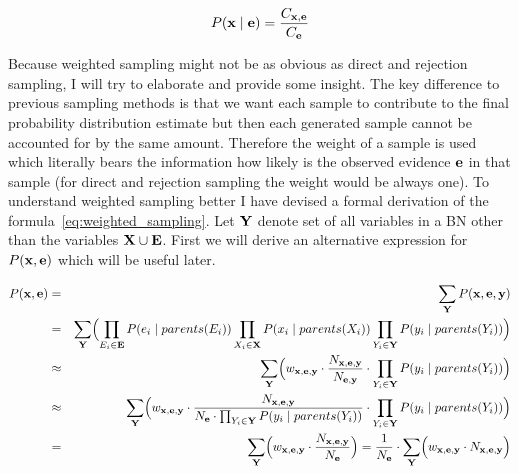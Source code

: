 \documentclass[english,cover]{fitthesis} %
\newcommand{\vars}[1]{{\bold{#1}}}         %
\begin{document}

\begin{equation}\label{eq:weighted_sampling}
    P(\vars{x} \mid \vars{e})
    = \frac{C_{\vars{x},\vars{e}}}{C_{\vars{e}}}
\end{equation}

Because weighted sampling might not be as obvious as direct and rejection sampling, I will try to elaborate and provide some insight. The key difference to previous sampling methods is that we want each sample to contribute to the final probability distribution estimate but then each generated sample cannot be accounted for by the same amount. Therefore the weight of a sample is used which literally bears the information how likely is the observed evidence $\vars{e}$ in that sample (for direct and rejection sampling the weight would be always one).
To understand weighted sampling better I have devised  a formal derivation of the formula~\eqref{eq:weighted_sampling}. Let $\vars{Y}$ denote set of all variables in a BN other than the variables $\vars{X} \cup \vars{E}$. First we will derive an alternative expression for $P(\vars{x}, \vars{e})$ which will be useful later.

\begin{eqnarray}
    P(\vars{x}, \vars{e})
    & = & \sum_\vars{Y} P(\vars{x}, \vars{e}, \vars{y}) \nonumber\\
    & = &
       \sum_\vars{Y} \Bigl( \prod_{E_i \in \vars{E}} P(e_i \mid parents(E_i)) \prod_{X_i \in \vars{X}} P(x_i \mid parents(X_i)) \prod_{Y_i \in \vars{Y}} P(y_i \mid parents(Y_i)) \Bigr) \nonumber\\
    & \approx &
       \sum_\vars{Y} \Bigl( w_{\vars{x},\vars{e},\vars{y}} \cdot \frac{N_{\vars{x},\vars{e},\vars{y}}}{N_{\vars{e},\vars{y}}} \cdot \prod_{Y_i \in \vars{Y}} P(y_i \mid parents(Y_i)) \Bigr) \nonumber\\
    & \approx &
       \sum_\vars{Y} \Bigl( w_{\vars{x},\vars{e},\vars{y}} \cdot \frac{N_{\vars{x},\vars{e},\vars{y}}}{N_{\vars{e}} \cdot \prod_{Y_i \in \vars{Y}} P(y_i \mid parents(Y_i))} \cdot \prod_{Y_i \in \vars{Y}} P(y_i \mid parents(Y_i)) \Bigr) \nonumber\\
    & = &
        \sum_\vars{Y} \Bigl( w_{\vars{x},\vars{e},\vars{y}} \cdot \frac{N_{\vars{x},\vars{e},\vars{y}}}{N_{\vars{e}}} \Bigr)
        = \frac{1}{N_\vars{e}} \cdot \sum_\vars{Y} \Bigl( w_{\vars{x},\vars{e},\vars{y}} \cdot N_{\vars{x},\vars{e},\vars{y}}\Bigr) \label{eq:weighted_sampling_P_x_e}
\end{eqnarray}
\end{document}
